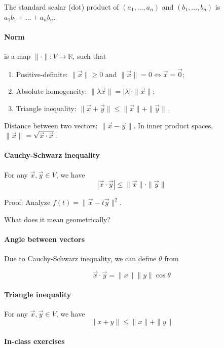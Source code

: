 \documentclass{article}
\begin{document}
The standard scalar (dot) product of $(a_1,\dots,a_n)$ and $(b_1,\dots,b_n)$ is $a_1 b_1 + \dots + a_n b_n$.

\paragraph{Norm} is a map $\|\cdot \| : V \to \mathbb R$, such that
\begin{enumerate}
    \item Positive-definite: $\|\vec x\| \geq 0$ and $\|\vec x\| = 0 \iff \vec x = \vec 0$;
    \item Absolute homogeneity: $\|\lambda \vec x\| = |\lambda| \cdot \|\vec x\|$;
    \item Triangle inequality: $\|\vec x+\vec y\| \leq \|\vec x\| + \|\vec y\|$.
\end{enumerate}

Distance between two vectors: $\|\vec x - \vec y\|$. In inner product spaces, $\|\vec x\| = \sqrt{\vec x \cdot \vec x}$.

\paragraph{Cauchy-Schwarz inequality} For any $\vec x, \vec y \in V$, we have $$ |\vec x \cdot \vec y| \leq \|\vec x\| \cdot \|\vec y\|$$

Proof: Analyze $f(t) = \|\vec x - t \vec y \|^2$.

What does it mean geometrically?

\paragraph{Angle between vectors} Due to Cauchy-Schwarz inequality, we can define $\theta$ from

$$
\vec x \cdot \vec y = \|x\| \|y\| \cos \theta
$$

\paragraph{Triangle inequality} For any $\vec x, \vec y \in V$, we have $$\|x + y\| \leq \|x\| + \|y\|$$

\paragraph{In-class exercises}
\end{document}
